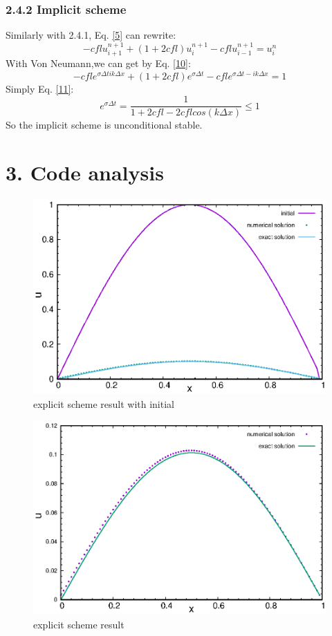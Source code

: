 \documentclass[12pt]{article}
\begin{document}
\subsubsection*{2.4.2 Implicit scheme}
Similarly with 2.4.1, Eq. \ref{5} can rewrite:
\begin{equation}
    -cflu_{i+1}^{n+1}+(1+2cfl)u_i^{n+1}-cflu_{i-1}^{n+1}=u_i^n\label{10}
\end{equation}
With Von Neumann,we can get by Eq. \ref{10}:
\begin{equation}
    -cfle^{\sigma\Delta tik\Delta x}+(1+2cfl)e^{\sigma\Delta t}-cfle^{\sigma\Delta t-ik\Delta x}=1\label{11}
\end{equation}
Simply Eq. \ref{11}:
\begin{equation*}
    e^{\sigma\Delta t}=\frac{1}{1+2cfl-2cflcos(k\Delta x)}\leq 1
\end{equation*}
So the implicit scheme is unconditional stable.

\section*{3. Code analysis}
\begin{figure}
    \centering
    \includegraphics{img/explicit.eps}
    \caption{explicit scheme result with initial }
    \label{fig:explicit}
\end{figure}

\begin{figure}
    \centering
    \includegraphics{img/explicit1.eps}
    \caption{explicit scheme result}
    \label{fig:explicit1}
\end{figure}
\end{document}
